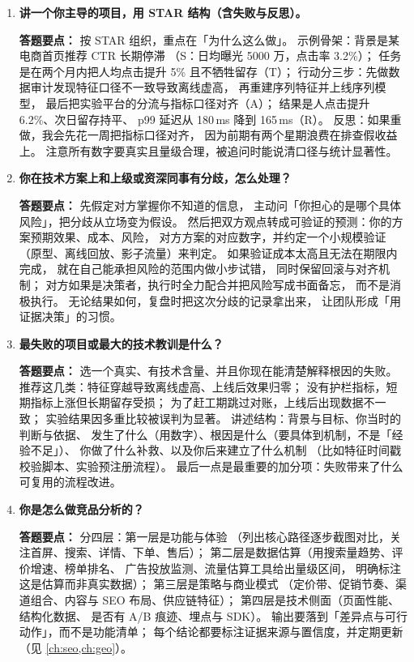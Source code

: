 \begin{interview}[题库与答题要点]
\begin{enumerate}[label=]
  \item[\textcolor{VioletDeep}{\textbf{Q138.}}] \textbf{讲一个你主导的项目，用 STAR 结构（含失败与反思）。}
\par\smallskip\noindent\textcolor{VioletDeep}{\textbf{答题要点：}}
按 STAR 组织，重点在「为什么这么做」。
示例骨架：背景是某电商首页推荐 CTR 长期停滞
（S：日均曝光 5000 万，点击率 3.2\%）；
任务是在两个月内把人均点击提升 5\% 且不牺牲留存（T）；
行动分三步：先做数据审计发现特征口径不一致导致离线虚高，
再重建序列特征并上线序列模型，
最后把实验平台的分流与指标口径对齐（A）；
结果是人点击提升 6.2\%、次日留存持平、
p99 延迟从 180\,ms 降到 165\,ms（R）。
反思：如果重做，我会先花一周把指标口径对齐，
因为前期有两个星期浪费在排查假收益上。
注意所有数字要真实且量级合理，被追问时能说清口径与统计显著性。

  \item[\textcolor{VioletDeep}{\textbf{Q139.}}] \textbf{你在技术方案上和上级或资深同事有分歧，怎么处理？}
\par\smallskip\noindent\textcolor{VioletDeep}{\textbf{答题要点：}}
先假定对方掌握你不知道的信息，
主动问「你担心的是哪个具体风险」，把分歧从立场变为假设。
然后把双方观点转成可验证的预测：你的方案预期效果、成本、风险，
对方方案的对应数字，并约定一个小规模验证
（原型、离线回放、影子流量）来判定。
如果验证成本太高且无法在期限内完成，
就在自己能承担风险的范围内做小步试错，
同时保留回滚与对齐机制；
对方如果是决策者，执行时全力配合并把风险写成书面备忘，
而不是消极执行。
无论结果如何，复盘时把这次分歧的记录拿出来，
让团队形成「用证据决策」的习惯。

  \item[\textcolor{VioletDeep}{\textbf{Q140.}}] \textbf{最失败的项目或最大的技术教训是什么？}
\par\smallskip\noindent\textcolor{VioletDeep}{\textbf{答题要点：}}
选一个真实、有技术含量、并且你现在能清楚解释根因的失败。
推荐这几类：特征穿越导致离线虚高、上线后效果归零；
没有护栏指标，短期指标上涨但长期留存受损；
为了赶工期跳过对账，上线后出现数据不一致；
实验结果因多重比较被误判为显著。
讲述结构：背景与目标、你当时的判断与依据、
发生了什么（用数字）、根因是什么（要具体到机制，不是「经验不足」）、
你做了什么补救、以及你后来建立了什么机制
（比如特征时间戳校验脚本、实验预注册流程）。
最后一点是最重要的加分项：失败带来了什么可复用的流程改进。

  \item[\textcolor{VioletDeep}{\textbf{Q141.}}] \textbf{你是怎么做竞品分析的？}
\par\smallskip\noindent\textcolor{VioletDeep}{\textbf{答题要点：}}
分四层：第一层是功能与体验
（列出核心路径逐步截图对比，关注首屏、搜索、详情、下单、售后）；
第二层是数据估算（用搜索量趋势、评价增速、榜单排名、
广告投放监测、流量估算工具给出量级区间，
明确标注这是估算而非真实数据）；
第三层是策略与商业模式
（定价带、促销节奏、渠道组合、内容与 SEO 布局、供应链特征）；
第四层是技术侧面（页面性能、结构化数据、
是否有 A/B 痕迹、埋点与 SDK）。
输出要落到「差异点与可行动作」，而不是功能清单；
每个结论都要标注证据来源与置信度，并定期更新（见 \cref{ch:seo,ch:geo}）。


\end{enumerate}
\end{interview}
